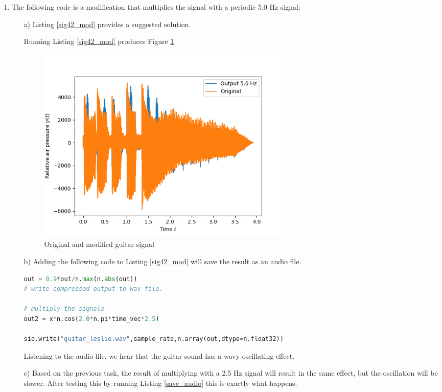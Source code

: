 \begin{enumerate}
\item The following code is a modification that multiplies the signal with a periodic 5.0 Hz signal:
\begin{itemize}
\item[a)] Listing \ref{sig42_mod} provides a suggested solution.

Running Listing \ref{sig42_mod} produces Figure \ref{fig:ex6b}.
\begin{figure}[h!]
    \centering
    \includegraphics[width=12.5cm,height=9.5cm]{ch06/figures/ex6b.png}
    \caption{Original and modified guitar signal}
    \label{fig:ex6b}
\end{figure}

\item[b)]
Adding the following code to Listing \ref{sig42_mod} will save the result as an audio file.
\begin{lstlisting}[language=Python,caption=Saving an audiofile,label=save_audio]
out = 0.9*out/n.max(n.abs(out)) 
# write compressed output to wav file.

# multiply the signals
out2 = x*n.cos(2.0*n.pi*time_vec*2.5)

sio.write("guitar_leslie.wav",sample_rate,n.array(out,dtype=n.float32))
\end{lstlisting}
Listening to the audio file, we hear that the guitar sound has a wavy oscillating effect.

\item[c)]
Based on the previous task, the result of multiplying with a 2.5 Hz signal will result in the same effect, but the oscillation will be slower. 
After testing this by running Listing \ref{save_audio} this is exactly what happens. 
\end{itemize}




\end{enumerate}